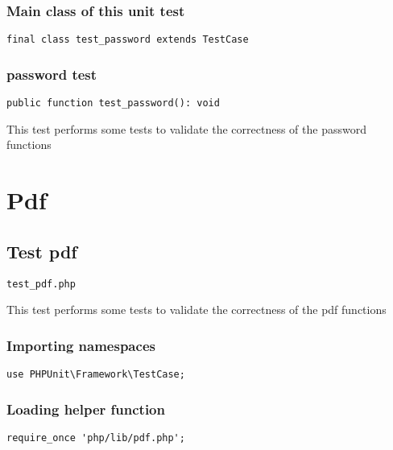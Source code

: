 \documentclass[a4paper]{article}
\begin{document}
\hypertarget{toc318}{}
\subsubsection{Main class of this unit test}

\begin{lstlisting}
final class test_password extends TestCase
\end{lstlisting}

\hypertarget{toc319}{}
\subsubsection{password test}

\begin{lstlisting}
public function test_password(): void
\end{lstlisting}

This test performs some tests to validate the correctness
of the password functions


\hypertarget{toc320}{}
\section{Pdf}

\hypertarget{toc321}{}
\subsection{Test pdf}

\begin{lstlisting}
test_pdf.php
\end{lstlisting}

This test performs some tests to validate the correctness
of the pdf functions

\hypertarget{toc322}{}
\subsubsection{Importing namespaces}

\begin{lstlisting}
use PHPUnit\Framework\TestCase;
\end{lstlisting}

\hypertarget{toc323}{}
\subsubsection{Loading helper function}

\begin{lstlisting}
require_once 'php/lib/pdf.php';
\end{lstlisting}
\end{document}
